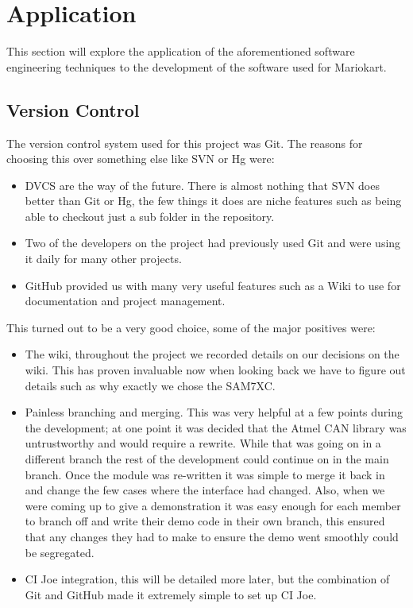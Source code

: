 \section{Application}

  This section will explore the application of the aforementioned software
  engineering techniques to the development of the software used for Mariokart.

  \subsection{Version Control}

    The version control system used for this project was Git.  The reasons for
    choosing this over something else like SVN or Hg were:

    \begin{itemize}
      \item DVCS are the way of the future.  There is almost nothing that SVN
      does better than Git or Hg, the few things it does are niche features such
      as being able to checkout just a sub folder in the repository.

      \item Two of the developers on the project had previously used Git and
      were using it daily for many other projects.

      \item GitHub provided us with many very useful features such as a Wiki to
      use for documentation and project management.
    \end{itemize}

    This turned out to be a very good choice, some of the major positives were:

    \begin{itemize}
      \item The wiki, throughout the project we recorded details on our
      decisions on the wiki.  This has proven invaluable now when looking back
      we have to figure out details such as why exactly we chose the SAM7XC.

      \item Painless branching and merging.  This was very helpful at a few
      points during the development; at one point it was decided that the Atmel
      CAN library was untrustworthy and would require a rewrite.  While that was
      going on in a different branch the rest of the development could continue
      on in the main branch.  Once the module was re-written it was simple to
      merge it back in and change the few cases where the interface had changed.
      Also, when we were coming up to give a demonstration it was easy enough
      for each member to branch off and write their demo code in their own
      branch, this ensured that any changes they had to make to ensure the demo
      went smoothly could be segregated.

      \item CI Joe integration, this will be detailed more later, but the
      combination of Git and GitHub made it extremely simple to set up CI Joe.
    \end{itemize}

